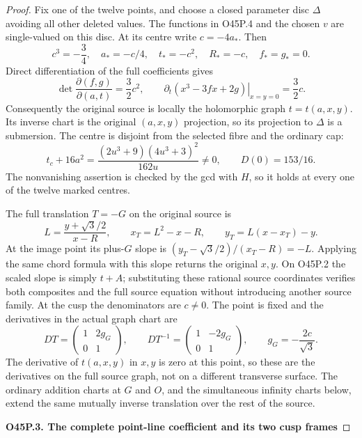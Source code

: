 \begin{proof}
\par\nobreak

Fix one of the twelve points, and choose a closed parameter disc
\(\Delta\) avoiding all other deleted values. The functions in
O45P.4 and the chosen \(v\) are single-valued on this disc.
At its centre write \(c=-4a_*\). Then
\[
 c^3=-\frac34,\quad a_*=-c/4,\quad
 t_*=-c^2,\quad R_*=-c,\quad f_*=g_*=0.
 \tag{O45P.9}
\]
Direct differentiation of the full coefficients gives
\[
 \det\frac{\partial(f,g)}{\partial(a,t)}=\frac32c^2,\qquad
 \left.\partial_t(x^3-3fx+2g)\right|_{x=y=0}=\frac32c.
 \tag{O45P.10}
\]
Consequently the original source is locally the holomorphic graph
\(t=t(a,x,y)\). Its inverse chart is the original \((a,x,y)\)
projection, so its projection to \(\Delta\) is a submersion.
The centre is disjoint from the selected fibre and the ordinary cap:
\[
 t_c+16a^2=\frac{(2u^3+9)(4u^3+3)^2}{162u}\ne0,\qquad
 D(0)=153/16.
 \tag{O45P.11}
\]
The nonvanishing assertion is checked by the gcd with \(H\), so it
holds at every one of the twelve marked centres.

The full translation \(T=-G\) on the original source is
\[
 L=\frac{y+\sqrt3/2}{x-R},\qquad
 x_T=L^2-x-R,\qquad y_T=L(x-x_T)-y.
 \tag{O45P.12}
\]
At the image point its plus-\(G\) slope is
\((y_T-\sqrt3/2)/(x_T-R)=-L\). Applying the same chord formula
with this slope returns the original \(x,y\).
On O45P.2 the scaled slope is simply \(t+A\); substituting these
rational source coordinates verifies both composites and the full
source equation without introducing another source family.
At the cusp the denominators are \(c\ne0\). The point is fixed and
the derivatives in the actual graph chart are
\[
 DT=\begin{pmatrix}1&2g_G\\0&1\end{pmatrix},\qquad
 DT^{-1}=\begin{pmatrix}1&-2g_G\\0&1\end{pmatrix},
 \qquad g_G=-\frac{2c}{\sqrt3}.
 \tag{O45P.13}
\]
The derivative of \(t(a,x,y)\) in \(x,y\) is zero at this point, so
these are the derivatives on the full source graph, not on a
different transverse surface. The ordinary addition charts at \(G\)
and \(O\), and the simultaneous infinity charts below, extend the
same mutually inverse translation over the rest of the source.

\par

\medskip\noindent\textbf{O45P.3. The complete point-line coefficient and its two cusp frames}


\end{proof}
